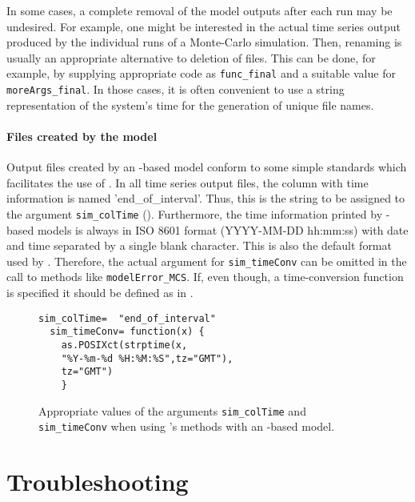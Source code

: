 In some cases, a complete removal of the model outputs after each run may be undesired. For example, one might be interested in the actual time series output produced by the individual runs of a Monte-Carlo simulation. Then, renaming is usually an appropriate alternative to deletion of files. This can be done, for example, by supplying appropriate code as \texttt{func\_final} and a suitable value for \texttt{moreArgs\_final}. In those cases, it is often convenient to use a string representation of the system's time for the generation of unique file names.

\paragraph{Files created by the model} Output files created by an -based model conform to some simple standards which facilitates the use of . In all time series output files, the column with time information is named 'end\_of\_interval'. Thus, this is the string to be assigned to the argument \texttt{sim\_colTime} (). Furthermore, the time information printed by -based models is always in ISO 8601 format (YYYY-MM-DD hh:mm:ss) with date and time separated by a single blank character. This is also the default format used by . Therefore, the actual argument for \texttt{sim\_timeConv} can be omitted in the call to methods like \texttt{modelError\_MCS}. If, even though, a time-conversion function is specified it should be defined as in .

\begin{figure}
\begin{lstlisting}[style=R]
  sim_colTime=  "end_of_interval"
  sim_timeConv= function(x) {
    as.POSIXct(strptime(x,
    "%Y-%m-%d %H:%M:%S",tz="GMT"),
    tz="GMT")
    }
\end{lstlisting}
\caption{Appropriate values of the arguments \texttt{sim\_colTime} and \texttt{sim\_timeConv} when using 's methods with an -based model. \label{fig:mops:echse:time}}
\end{figure}

\section{Troubleshooting} \label{sec:mops:troubleshooting}

